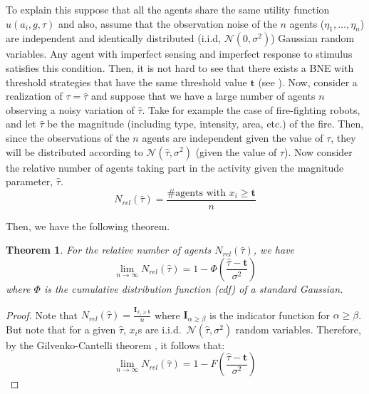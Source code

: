 \documentclass[conference]{ieeeconf}
\newtheorem{theorem}{Theorem}
\newcommand{\td}{\mathbf{t}}
\begin{document}
To explain this suppose that all the agents share the same utility function $u(a_i,g,\tau)$ and also, assume that the observation noise of the $n$ agents ($\eta_1,\ldots,\eta_n$) are independent and identically distributed (i.i.d, $\mathcal{N}(0,\sigma^2)$) Gaussian random variables. Any agent with imperfect sensing and imperfect response to stimulus satisfies this condition. Then, it is not hard to see that there exists a BNE with threshold strategies that have the same threshold value $\td$ (see  \cite{Morris2000}). Now, consider a realization of $\tau=\hat{\tau}$ and suppose that we have a large number of agents $n$ observing a noisy variation of $\hat{\tau}$. Take for example the case of fire-fighting robots, and let $\hat{\tau}$ be the magnitude (including type, intensity, area, etc.) of the fire. Then, since the observations of the $n$ agents are independent given the value of $\tau$, they will be distributed according to $\mathcal{N}(\hat{\tau},\sigma^2)$ (given the value of $\tau$). Now consider the relative number of agents taking part in the activity given the magnitude parameter, $\hat{\tau}$.
\begin{equation}\label{eqn:Nrel}
	N_{rel}(\hat{\tau})=\frac{\#\text{agents with }x_i\geq \td}{n}
\end{equation}

Then, we have the following theorem.
\begin{theorem}\label{thrm:relativefrequency}
For the relative number of agents $N_{rel}(\hat{\tau})$, we have
\begin{equation}
\lim_{n\to\infty}N_{rel}(\hat{\tau})=1-\Phi(\frac{\hat{\tau}-\td}{\sigma^2})
\end{equation}
where $\Phi$ is the cumulative distribution function (cdf) of a standard Gaussian. 
\end{theorem}
\begin{proof}
Note that $N_{rel}(\hat{\tau})=\frac{\mathbf{I}_{x_i\geq \td}}{n}$ where $\mathbf{I}_{\alpha\geq \beta}$ is the indicator function for $\alpha\geq \beta$. But note that for a given $\hat{\tau}$, $x_i$s are i.i.d.\ $\mathcal{N}(\hat{\tau},\sigma^2)$ random variables. Therefore, by the Gilvenko-Cantelli theorem \cite{durrett2010}, it follows that:
\begin{equation}
\lim_{n\to\infty}N_{rel}(\hat{\tau})=1-F(\frac{\hat{\tau}-\td}{\sigma^2})
\end{equation}
\end{proof}
\end{document}
